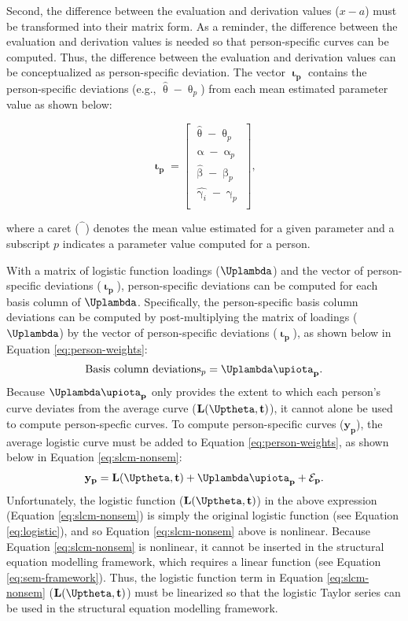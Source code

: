 \documentclass[
12pt, %
twoside,
english]{guelphthesis}
\begin{document}
Second, the difference between the evaluation and derivation values (\(x - a\)) must be transformed into their matrix form. As a reminder, the difference between the evaluation and derivation values is needed so that person-specific curves can be computed. Thus, the difference between the evaluation and derivation values can be conceptualized as person-specific deviation. The vector \(\mathbf{\upiota_p}\) contains the person-specific deviations (e.g., \(\hat{\uptheta} - \uptheta_p\)) from each mean estimated parameter value as shown below:

\[ 
\mathbf{\upiota_p} = 
\begin{bmatrix}
\hat{\uptheta} - \uptheta_p   \\ 
\hat{\upalpha} - \upalpha_p   \\ 
\hat{\upbeta} - \upbeta_p \\ 
\hat{\upgamma_i} - \upgamma_p \\
\end{bmatrix},
\]

\noindent where a caret (\(\hat{\phantom{\beta}}\)) denotes the mean value estimated
for a given parameter and a subscript \(p\) indicates a parameter value
computed for a person.

With a matrix of logistic function loadings (\(\mathbf{\Uplambda}\)) and the vector of person-specific deviations (\(\mathbf{\upiota_p}\)), person-specific deviations can be computed for each basis column of \(\mathbf{\Uplambda}\). Specifically, the person-specific basis column deviations can be computed by post-multiplying the matrix of loadings (\(\mathbf{\Uplambda}\)) by the vector of person-specific deviations (\(\mathbf{\upiota_p}\)), as shown below in Equation \ref{eq:person-weights}:
\begin{align}
 \text{Basis column deviations}_p = \mathbf{\Uplambda\upiota_p}.
 \label{eq:person-weights}
\end{align}
\noindent Because \(\mathbf{\Uplambda\upiota_p}\) only provides the extent to which each person's curve deviates from the average curve (\(\mathbf{L(\Uptheta, t)}\)), it cannot alone be used to compute person-specfic curves. To compute person-specific curves (\(\mathbf{y_p}\)), the average logistic curve must be added to Equation \ref{eq:person-weights}, as shown below in Equation \ref{eq:slcm-nonsem}:
\begin{align}
 \mathbf{y_p} = \mathbf{L(\Uptheta, t)} + \mathbf{\Uplambda\upiota_p} + \mathbf{\mathcal{E}_p}.
 \label{eq:slcm-nonsem}
\end{align}
\noindent Unfortunately, the logistic function (\(\mathbf{L(\Uptheta, t)}\)) in the above expression (Equation \ref{eq:slcm-nonsem}) is simply the original logistic function (see Equation \ref{eq:logistic}), and so Equation \ref{eq:slcm-nonsem} above is nonlinear. Because Equation \ref{eq:slcm-nonsem} is nonlinear, it cannot be inserted in the structural equation modelling framework, which requires a linear function (see Equation \ref{eq:sem-framework}). Thus, the logistic function term in Equation \ref{eq:slcm-nonsem} (\(\mathbf{L(\Uptheta, t)}\)) must be linearized so that the logistic Taylor series can be used in the structural equation modelling framework.
\end{document}
